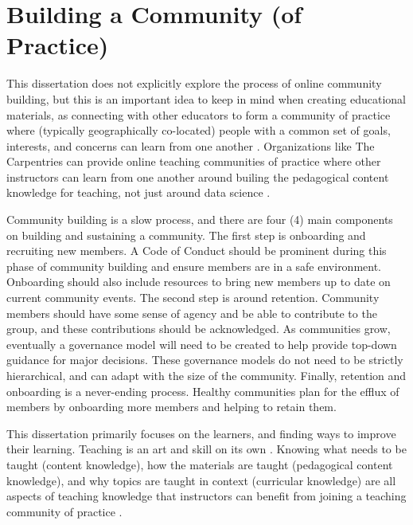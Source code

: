 \documentclass[../main.tex]{subfiles}
\begin{document}
        

    \section{Building a Community (of Practice)}

        This dissertation does not explicitly explore the process of online community building,
        but this is an important idea to keep in mind when creating educational materials,
        as connecting with other educators to form a community of practice
        where (typically geographically co-located) people with a common set of goals, interests, and concerns
        can learn from one another
        \cite{wilson2019teaching}.
        Organizations like The Carpentries can provide online teaching communities of practice
        where other instructors can learn from one another around
        builing the pedagogical content knowledge for teaching, not just around data science
        \cite{CarpentriesHowWe, shulmanThoseWhoUnderstand1986}.

        Community building is a slow process, and there are four (4) main components on building and sustaining a community.
        The first step is onboarding and recruiting new members.
        A Code of Conduct should be prominent during this phase of community building and ensure members are in a safe environment.
        Onboarding should also include resources to bring new members up to date on current community events.
        The second step is around retention.
        Community members should have some sense of agency and be able to contribute to the group,
        and these contributions should be acknowledged.
        As communities grow, eventually a governance model will need to be created to help
        provide top-down guidance for major decisions.
        These governance models do not need to be strictly hierarchical,
        and can adapt with the size of the community.
        Finally, retention and onboarding is a never-ending process.
        Healthy communities plan for the efflux of members by onboarding more members and helping to retain them.

        This dissertation primarily focuses on the learners, and finding ways to improve their learning.
        Teaching is an art and skill on its own
        \cite{greenBuildingBetterTeacher2014, wilson2019teaching}.
        Knowing what needs to be taught (content knowledge),
        how the materials are taught (pedagogical content knowledge), and
        why topics are taught in context (curricular knowledge)
        are all aspects of teaching knowledge that instructors can benefit from joining a teaching
        community of practice
        \cite{shulmanThoseWhoUnderstand1986, greenBuildingBetterTeacher2014, wilson2019teaching}.
\end{document}
